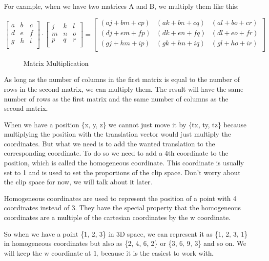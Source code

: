 \documentclass[12pt]{report} \usepackage{preamble}
\begin{document}
For example, when we have two matrices A and B, we multiply them like this:

\[
	\begin{bmatrix}
		a & b & c \\
		d & e & f \\
		g & h & i \\
	\end{bmatrix}
	\cdot
	\begin{bmatrix}
		j & k & l \\
		m & n & o \\
		p & q & r \\
	\end{bmatrix}
	=
	\begin{bmatrix}
		(aj + bm + cp) & (ak + bn + cq) & (al + bo + cr) \\
		(dj + em + fp) & (dk + en + fq) & (dl + eo + fr) \\
		(gj + hm + ip) & (gk + hn + iq) & (gl + ho + ir) \\
	\end{bmatrix}
\]

\begin{figure}[hbtp]
	\centering 
	\caption{Matrix Multiplication \cite{fig:matrix-multiplication}}
\end{figure}
\FloatBarrier

As long as the number of columns in the first matrix is equal to the number
of rows in the second matrix, we can multiply them. The result will have
the same number of rows as the first matrix and the same number of columns
as the second matrix.

When we have a position \{x, y, z\} we cannot just move it by \{tx, ty, tz\}
because multiplying the position with the translation vector would just
multiply the coordinates. But what we need is to add the wanted translation
to the corresponding coordinate.
To do so we need to add a 4th coordinate to the position, which is called
the homogeneous coordinate. This coordinate is usually set to 1 and is used
to set the proportions of the clip space. Don't worry about the clip space
for now, we will talk about it later.

Homogeneous coordinates are used to represent the position of a point with 4
coordinates instead of 3. They have the special property that the homogeneous
coordinates are a multiple of the cartesian coordinates by the w coordinate.

So when we have a point \{1, 2, 3\} in 3D space, we can represent it as
\{1, 2, 3, 1\} in homogeneous coordinates but also as \{2, 4, 6, 2\} or
\{3, 6, 9, 3\} and so on. We will keep the w coordinate at 1, because it is
the easiest to work with.
\end{document}
